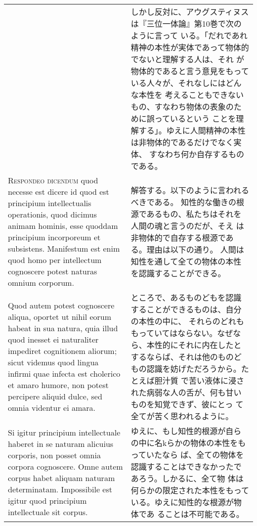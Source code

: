 \documentclass[10pt]{jsarticle} %
\begin{document}
\begin{longtable}{p{21em}p{21em}}
&

しかし反対に、アウグスティヌスは『三位一体論』第10巻で次のように言って
いる。「だれであれ精神の本性が実体であって物体的でないと理解する人は、それ
 が物体的であると言う意見をもっている人々が、それなしにはどんな本性を
 考えることもできないもの、すなわち物体の表象のために誤っているという
 ことを理解する」。ゆえに人間精神の本性は非物体的であるだけでなく実体、
 すなわち何か自存するものである。


\\



{\scshape Respondeo dicendum} quod necesse est dicere id quod est principium
intellectualis operationis, quod dicimus animam hominis, esse quoddam
principium incorporeum et subsistens. Manifestum est enim quod homo
per intellectum cognoscere potest naturas omnium corporum. 


&

解答する。以下のように言われるべきである。
知性的な働きの根源であるもの、私たちはそれを人間の魂と言うのだが、そえ
 は非物体的で自存する根源である。理由は以下の通り。
人間は知性を通して全ての物体の本性を認識することができる。

\\



Quod autem
potest cognoscere aliqua, oportet ut nihil eorum habeat in sua natura,
quia illud quod inesset ei naturaliter impediret cognitionem aliorum;
sicut videmus quod lingua infirmi quae infecta est cholerico et amaro
humore, non potest percipere aliquid dulce, sed omnia videntur ei
amara. 

&

ところで、あるものどもを認識することができるものは、自分の本性の中に、
それらのどれももっていてはならない。なぜなら、本性的にそれに内在したと
するならば、それは他のものどもの認識を妨げただろうから。たとえば胆汁質
 で苦い液体に浸された病弱な人の舌が、何も甘いものを知覚できず、彼にとっ
 て全てが苦く思われるように。


\\



Si igitur principium intellectuale haberet in se naturam
alicuius corporis, non posset omnia corpora cognoscere. Omne autem
corpus habet aliquam naturam determinatam. Impossibile est igitur quod
principium intellectuale sit corpus. 

&

ゆえに、もし知性的根源が自らの中に名kらかの物体の本性をもっていたなら
 ば、全ての物体を認識することはできなかったであろう。しかるに、全て物
 体は何らかの限定された本性をもっている。ゆえに知性的な根源が物体であ
 ることは不可能である。



\end{longtable}
\end{document}
